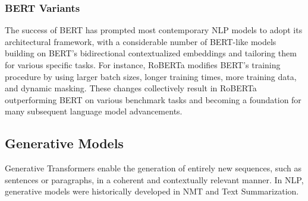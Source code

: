 \subsubsection{BERT Variants}

The success of BERT has prompted most contemporary \ac{NLP} models to adopt its architectural framework, with a considerable number of \ac{BERT}-like models building on \ac{BERT}'s bidirectional contextualized embeddings and tailoring them for various specific tasks. For instance, \ac{RoBERTa} \citep{liu2019roberta} modifies BERT's training procedure by using larger batch sizes, longer training times, more training data, and dynamic masking. These changes collectively result in \ac{RoBERTa} outperforming \ac{BERT} on various benchmark tasks and becoming a foundation for many subsequent language model advancements.




\subsection{Generative Models} 

Generative Transformers enable the generation of entirely new sequences, such as sentences or paragraphs, in a coherent and contextually relevant manner. In \ac{NLP}, generative models were historically developed in \ac{NMT} and Text Summarization. 





